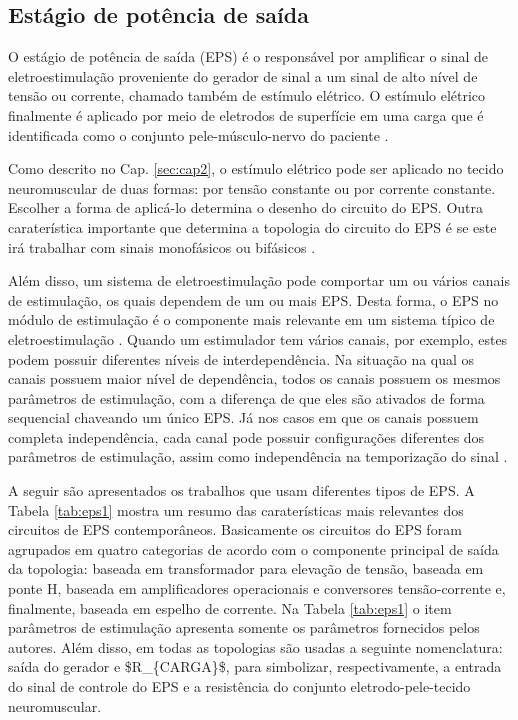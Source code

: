 \subsection{Estágio de potência de saída}
\label{sub_cap:eps}

O estágio de potência de saída (\acrshort{EPS}) é o responsável por amplificar o sinal de eletroestimulação proveniente do gerador de sinal a um sinal de alto nível de tensão ou corrente, chamado também de estímulo elétrico. O estímulo elétrico finalmente é aplicado por meio de eletrodos de superfície em uma carga que é identificada como o conjunto pele-músculo-nervo do paciente \cite{Souza2017PowerSystems}.

Como descrito no Cap. \ref{sec:cap2}, o estímulo elétrico pode ser aplicado no tecido neuromuscular de duas formas: por tensão constante ou por corrente constante. Escolher a forma de aplicá-lo determina o desenho do circuito do \acrshort{EPS}. Outra caraterística importante que determina a topologia do circuito do \acrshort{EPS} é se este irá trabalhar com sinais monofásicos ou bifásicos \cite{Ilic1994ASystems}. 

Além disso, um sistema de eletroestimulação pode comportar um ou vários canais de estimulação, os quais dependem de um ou mais \acrshort{EPS}. Desta forma, o \acrshort{EPS} no módulo de estimulação é o componente mais relevante em um sistema típico de eletroestimulação \cite{Ilic1994ASystems, Velloso2007SistemaFES-PEB}. Quando um estimulador tem vários canais, por exemplo, estes podem possuir diferentes níveis de interdependência. Na situação na qual os canais possuem maior nível de dependência, todos os canais possuem os mesmos parâmetros de estimulação, com a diferença de que eles são ativados de forma sequencial chaveando um único \acrshort{EPS}. Já nos casos em que os canais possuem completa independência, cada canal pode possuir configurações diferentes dos parâmetros de estimulação, assim como independência na temporização do sinal \cite{Faria2006ImplementacaoMedulares,Wu2002AApplications, Quark2013DualpexNeuromuscular}. 

A seguir são apresentados os trabalhos que usam diferentes tipos de \acrshort{EPS}. A Tabela \ref{tab:eps1} mostra um resumo das caraterísticas mais relevantes dos circuitos de \acrshort{EPS} contemporâneos. Basicamente os circuitos do \acrshort{EPS} foram agrupados em quatro categorias de acordo com o componente principal de saída da topologia: baseada em transformador para elevação de tensão, baseada em ponte H, baseada em amplificadores operacionais e conversores tensão-corrente e, finalmente, baseada em espelho de corrente. Na Tabela \ref{tab:eps1} o item parâmetros de estimulação apresenta somente os parâmetros fornecidos pelos autores. Além disso, em todas as topologias são usadas a seguinte nomenclatura: saída do gerador e \acrshort{$R_{CARGA}$}, para simbolizar, respectivamente, a entrada do sinal de controle do \acrshort{EPS} e a resistência do conjunto eletrodo-pele-tecido neuromuscular.


